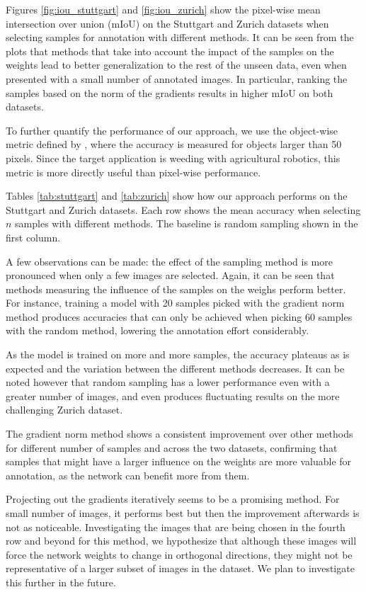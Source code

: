 \documentclass[letterpaper, 10 pt, conference]{ieeeconf}  %
\begin{document}
Figures \ref{fig:iou_stuttgart} and \ref{fig:iou_zurich} show the pixel-wise mean intersection over union (mIoU) on the Stuttgart and Zurich datasets when selecting samples for annotation with different methods. It can be seen from the plots that methods that take into account the impact of the samples on the weights lead to better generalization to the rest of the unseen data, even when presented with a small number of annotated images. In particular, ranking the samples based on the norm of the gradients results in higher mIoU on both datasets.

To further quantify the performance of our approach, we use the object-wise metric defined by \cite{milioto2018real}, where the accuracy is measured for objects larger than 50 pixels. Since the target application is weeding with agricultural robotics, this metric is more directly useful than pixel-wise performance.  


Tables \ref{tab:stuttgart} and \ref{tab:zurich} show how our approach performs on the Stuttgart and Zurich datasets. Each row shows the mean accuracy when selecting $n$ samples with different methods. The baseline is random sampling shown in the first column.


A few observations can be made: the effect of the sampling method is more pronounced when only a few images are selected. Again, it can be seen that methods measuring the influence of the samples on the weighs perform better. For instance, training a model with 20 samples picked with the gradient norm method produces accuracies that can only be achieved when picking 60 samples with the random method, lowering the annotation effort considerably.

As the model is trained on more and more samples, the accuracy plateaus as is expected and the variation between the different methods decreases. It can be noted however that random sampling has a lower performance even with a greater number of images, and even produces fluctuating results on the more challenging Zurich dataset.

The gradient norm method shows a consistent improvement over other methods for different number of samples and across the two datasets, confirming that samples that might have a larger influence on the weights are more valuable for annotation, as the network can benefit more from them.

Projecting out the gradients iteratively seems to be a promising method. For small number of images, it performs best but then the improvement afterwards is not as noticeable. Investigating the images that are being chosen in the fourth row and beyond for this method, we hypothesize that although these images will force the network weights to change in orthogonal directions, they might not be representative of a larger subset of images in the dataset. We plan to investigate this further in the future. 
\end{document}
